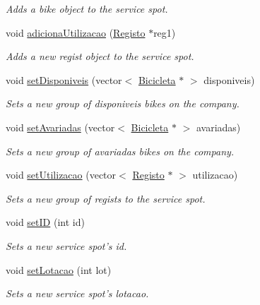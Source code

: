 \begin{DoxyCompactItemize}
\begin{DoxyCompactList}\small\item\em Adds a bike object to the service spot. \end{DoxyCompactList}\item 
void \hyperlink{class_posto_servico_a0371ddda624f3760c76f04a4b6e767d0}{adiciona\+Utilizacao} (\hyperlink{class_registo}{Registo} $\ast$reg1)
\begin{DoxyCompactList}\small\item\em Adds a new regist object to the service spot. \end{DoxyCompactList}\item 
void \hyperlink{class_posto_servico_a0ee0fe238467db3ea6f207d528a6e2e9}{set\+Disponiveis} (vector$<$ \hyperlink{class_bicicleta}{Bicicleta} $\ast$ $>$ disponiveis)
\begin{DoxyCompactList}\small\item\em Sets a new group of disponiveis bikes on the company. \end{DoxyCompactList}\item 
void \hyperlink{class_posto_servico_afb5c121f880c880bdcc75033eb9bc7f2}{set\+Avariadas} (vector$<$ \hyperlink{class_bicicleta}{Bicicleta} $\ast$ $>$ avariadas)
\begin{DoxyCompactList}\small\item\em Sets a new group of avariadas bikes on the company. \end{DoxyCompactList}\item 
void \hyperlink{class_posto_servico_ae63f7836c55f4eb38d8916c140f62162}{set\+Utilizacao} (vector$<$ \hyperlink{class_registo}{Registo} $\ast$ $>$ utilizacao)
\begin{DoxyCompactList}\small\item\em Sets a new group of regists to the service spot. \end{DoxyCompactList}\item 
void \hyperlink{class_posto_servico_a68ca412e4456c344981f6cb0b01c4184}{set\+I\+D} (int id)
\begin{DoxyCompactList}\small\item\em Sets a new service spot's id. \end{DoxyCompactList}\item 
void \hyperlink{class_posto_servico_a0acde19dbfc74b355e1aa2e34f25fa11}{set\+Lotacao} (int lot)
\begin{DoxyCompactList}\small\item\em Sets a new service spot's lotacao. \end{DoxyCompactList}\item 

\end{DoxyCompactItemize}
